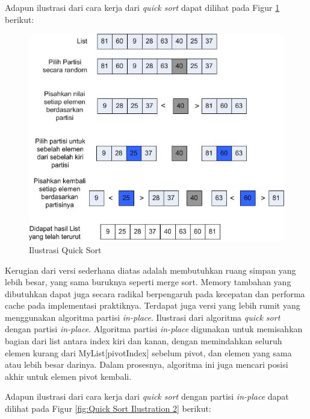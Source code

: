 \documentclass[12pt]{book}%
\begin{document}
\newpage{}
Adapun ilustrasi dari cara kerja dari \textit{quick sort} dapat dilihat pada Figur \ref{fig:Quick Sort Ilustration} berikut:

\begin{figure}[htbp]
\begin{center}
	\includegraphics[scale=0.8]{fig/sunario-3/QuickSort.jpg}%
	\caption{Ilustrasi Quick Sort}%
	\label{fig:Quick Sort Ilustration}%
\end{center}
\end{figure}

Kerugian dari versi sederhana diatas adalah membutuhkan ruang simpan yang lebih besar, yang sama buruknya seperti merge sort. Memory tambahan yang dibutuhkan dapat juga secara radikal berpengaruh pada kecepatan dan performa cache pada implementasi praktiknya. Terdapat juga versi yang lebih rumit yang menggunakan algoritma partisi \textit{in-place}. Ilustrasi dari algoritma \textit{quick sort} dengan partisi \textit{in-place}. Algoritma partisi \textit{in-place} digunakan untuk memisahkan bagian dari list antara index kiri dan kanan, dengan memindahkan seluruh elemen kurang dari MyList[pivotIndex] sebelum pivot, dan elemen yang sama atau lebih besar darinya. Dalam prosesnya, algoritma ini juga mencari posisi akhir untuk elemen pivot kembali. 


Adapun ilustrasi dari cara kerja dari \textit{quick sort} dengan partisi \textit{in-place} dapat dilihat pada Figur \ref{fig:Quick Sort Ilustration 2} berikut:
\end{document}
